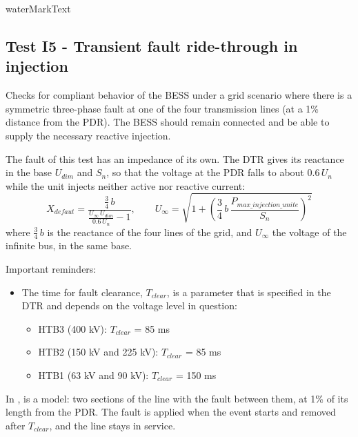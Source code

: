     {{ waterMarkText }}

    \renewcommand{\DTRPcs}{ThreePhaseFault} %
    \renewcommand{\PCSname}{PCS_RTE-I16z3}
    \renewcommand{\OCname}{TransientImpedantInjection}


    \subsection{Test I5 - Transient fault ride-through in injection}

    Checks for compliant behavior of the BESS under a grid scenario where there
    is a symmetric three-phase fault at one of the four transmission lines
    (at a 1\% distance from the PDR). The BESS should remain connected and
    be able to supply the necessary reactive injection.

    The fault of this test has an impedance of its own. The DTR gives its reactance
    in the base $U_{dim}$ and $S_n$, so that the voltage at the PDR falls to
    about $0.6\,U_n$ while the unit injects neither active nor reactive current:
    \[
        X_{defaut} = \frac{\frac{3}{4}\,b}{\frac{U_\infty\,U_{dim}}{0.6\,U_n} - 1},
        \qquad
        U_\infty = \sqrt{1 + \left(\frac{3}{4}\,b\,\frac{P_{max\_injection\_unite}}{S_n}\right)^2}
    \]
    where $\frac{3}{4}\,b$ is the reactance of the four lines of the grid, and
    $U_\infty$ the voltage of the infinite bus, in the same base.

    \GridCircuitZthree

    \noindent Important reminders:
    \begin{itemize}
        \item The time for fault clearance, $T_{clear}$, is a parameter that
        is specified in the DTR and depends on the voltage level in
        question:
        \begin{itemize}
            \item HTB3 (400 kV): $T_{clear}$ = 85 ms
            \item HTB2 (150 kV and 225 kV): $T_{clear}$ = 85 ms
            \item HTB1 (63 kV and 90 kV): $T_{clear}$ = 150 ms
        \end{itemize}
    \end{itemize}

    In \Dynawo{},  is a  model: two sections of the
    line with the fault between them, at 1\% of its length from the PDR. The
    fault is applied when the event starts and removed after $T_{clear}$, and the
    line stays in service.

